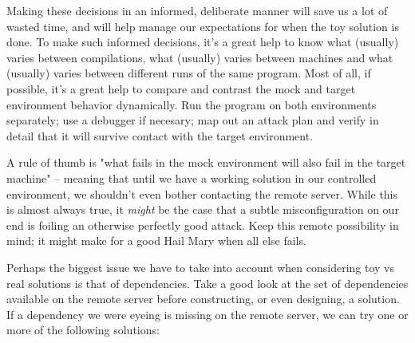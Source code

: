 \documentclass{article}
\begin{document}
Making these decisions in an informed, deliberate manner will save us a lot of wasted time, and will help manage our expectations for when the toy solution is done. To make such informed decisions, it's a great help to know what (usually) varies between compilations, what (usually) varies between machines and what (usually) varies between different runs of the same program. Most of all, if possible, it's a great help to compare and contrast the mock and target environment behavior dynamically. Run the program on both environments separately; use a debugger if necesary; map out an attack plan and verify in detail that it will survive contact with the target environment.

A rule of thumb is "what fails in the mock environment will also fail in the target machine" -- meaning that until we have a working solution in our controlled environment, we shouldn't even bother contacting the remote server. While this is almost always true, it \textit{might} be the case that a subtle misconfiguration on our end is foiling an otherwise perfectly good attack. Keep this remote possibility in mind; it might make for a good Hail Mary when all else fails.

Perhaps the biggest issue we have to take into account when considering toy vs real solutions is that of dependencies. Take a good look at the set of dependencies available on the remote server before constructing, or even designing, a solution. If a dependency we were eyeing is missing on the remote server, we can try one or more of the following solutions:
\end{document}
